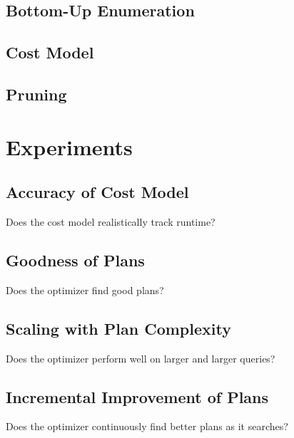 \subsection{Bottom-Up Enumeration}




\subsection{Cost Model}




\subsection{Pruning}




\section{Experiments}

\subsection{Accuracy of Cost Model}
Does the cost model realistically track runtime?


\subsection{Goodness of Plans}
Does the optimizer find good plans? 



\subsection{Scaling with Plan Complexity}
Does the optimizer perform well on larger and larger queries?



\subsection{Incremental Improvement of Plans}
Does the optimizer continuously find better plans as it searches?









